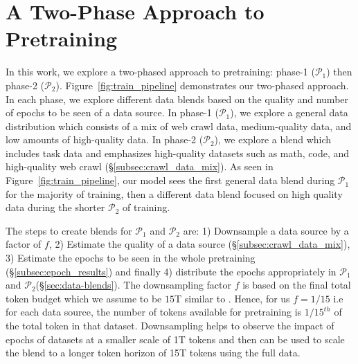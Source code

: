 \documentclass[11pt]{article}
\newcommand{\mostofa}[1]{{\color{blue}\bf [MP: #1]}\xspace}
\newcommand{\steven}[1]{\textcolor{magenta}{\bf\small [Steven: #1]}\xspace}
\newcommand{\phaseone}{$\mathcal{P}_1$\xspace}
\newcommand{\phasetwo}{$\mathcal{P}_2$\xspace}
\begin{document}

\section{A Two-Phase Approach to Pretraining}


In this work, we explore a two-phased approach to pretraining: phase-1 (\phaseone) then phase-2 (\phasetwo).
Figure~\ref{fig:train_pipeline} demonstrates our two-phased approach.
In each phase, we explore different data blends based on the quality and number of epochs to be seen of a data source.
In phase-1 (\phaseone), we explore a general data distribution 
which consists of a mix of web crawl data, medium-quality data, and low amounts of high-quality data.
In phase-2 (\phasetwo), we explore a blend 
which includes task data and emphasizes high-quality datasets such as math, code, and high-quality web crawl (\S\ref{subsec:crawl_data_mix}).
As seen in Figure~\ref{fig:train_pipeline}, 
our model sees the first general  data blend during \phaseone for the majority of training, then a different data blend focused on high quality data during the shorter \phasetwo of training.

The steps to create blends for \phaseone and \phasetwo are: 1) Downsample a data source by a factor of $f$, 2) Estimate the quality of a data source (\S\ref{subsec:crawl_data_mix}), 3) Estimate the epochs to be seen in the whole pretraining (\S\ref{subsec:epoch_results}) and finally 4) distribute the epochs appropriately in \phaseone and \phasetwo (\S\ref{sec:data-blends}).
The downsampling factor $f$ is based on the final total token budget which we assume to be $15$T similar to \citet{llama3-dubey2024llama3herdmodels}.
Hence, for us $f=1/15$ i.e for each data source, the number of tokens available for pretraining is $1/15^{th}$ of the total token in that dataset.
Downsampling helps to observe the impact of epochs of datasets at a smaller scale of 1T tokens and then can be used to scale the blend to a longer token horizon of 15T tokens using the full data. %
\end{document}
